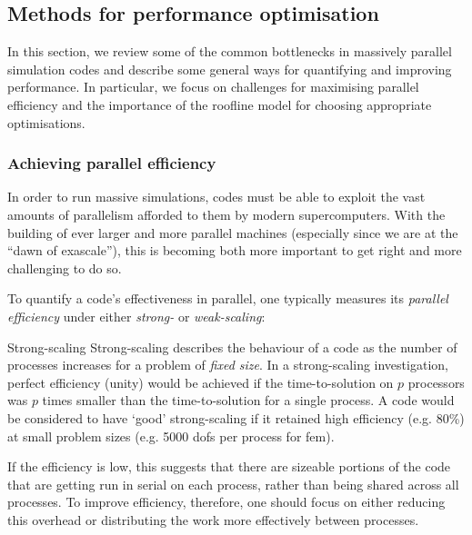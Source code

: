 \subsection{Methods for performance optimisation}

In this section, we review some of the common bottlenecks in massively parallel simulation codes and describe some general ways for quantifying and improving performance.
In particular, we focus on challenges for maximising parallel efficiency and the importance of the roofline model for choosing appropriate optimisations.

\subsubsection{Achieving parallel efficiency}
\label{sec:background_perf_efficiency}

In order to run massive simulations, codes must be able to exploit the vast amounts of parallelism afforded to them by modern supercomputers.
With the building of ever larger and more parallel machines (especially since we are at the ``dawn of exascale''), this is becoming both more important to get right and more challenging to do so.

To quantify a code's effectiveness in parallel, one typically measures its \textit{parallel efficiency} under either \textit{strong-} or \textit{weak-scaling}:

\begin{paragraph}{Strong-scaling}
  Strong-scaling describes the behaviour of a code as the number of processes increases for a problem of \textit{fixed size}.
  In a strong-scaling investigation, perfect efficiency (unity) would be achieved if the time-to-solution on $p$ processors was $p$ times smaller than the time-to-solution for a single process.
  A code would be considered to have `good' strong-scaling if it retained high efficiency (e.g. 80\%) at small problem sizes (e.g. 5000 \glspl{dof} per process for \gls{fem}).

  If the efficiency is low, this suggests that there are sizeable portions of the code that are getting run in serial on each process, rather than being shared across all processes.
  To improve efficiency, therefore, one should focus on either reducing this overhead or distributing the work more effectively between processes.
\end{paragraph}

